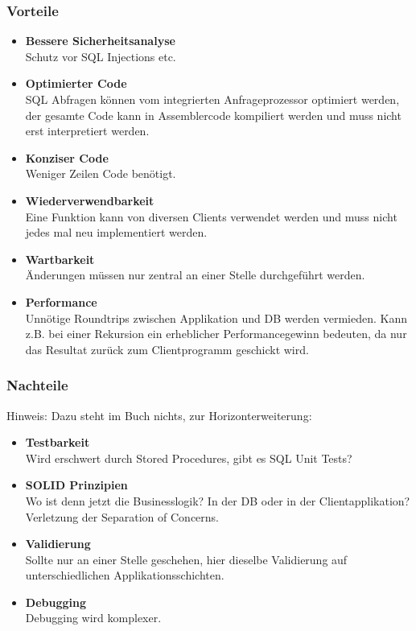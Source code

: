 \subsubsection{Vorteile}
\begin{itemize}
    \item \textbf{Bessere Sicherheitsanalyse} \\
        Schutz vor SQL Injections etc.
    \item \textbf{Optimierter Code} \\
        SQL Abfragen können vom integrierten Anfrageprozessor optimiert werden, der gesamte Code kann in Assemblercode kompiliert werden und muss nicht erst interpretiert werden.
    \item \textbf{Konziser Code} \\
        Weniger Zeilen Code benötigt.
    \item \textbf{Wiederverwendbarkeit} \\
        Eine Funktion kann von diversen Clients verwendet werden und muss nicht jedes mal neu implementiert werden.
    \item \textbf{Wartbarkeit} \\
        Änderungen müssen nur zentral an einer Stelle durchgeführt werden.
    \item \textbf{Performance} \\
        Unnötige Roundtrips zwischen Applikation und DB werden vermieden. Kann z.B. bei einer Rekursion ein erheblicher Performancegewinn bedeuten, da nur das Resultat zurück zum Clientprogramm geschickt wird.    
\end{itemize}

\subsubsection{Nachteile}

Hinweis: Dazu steht im Buch nichts, zur Horizonterweiterung:

\begin{itemize}
    \item \textbf{Testbarkeit} \\
    Wird erschwert durch Stored Procedures, gibt es SQL Unit Tests?
    \item \textbf{SOLID Prinzipien} \\
    Wo ist denn jetzt die Businesslogik? In der DB oder in der Clientapplikation? Verletzung der Separation of Concerns.
    \item \textbf{Validierung} \\
    Sollte nur an einer Stelle geschehen, hier dieselbe Validierung auf unterschiedlichen Applikationsschichten.
    \item \textbf{Debugging} \\
    Debugging wird komplexer.
\end{itemize}

